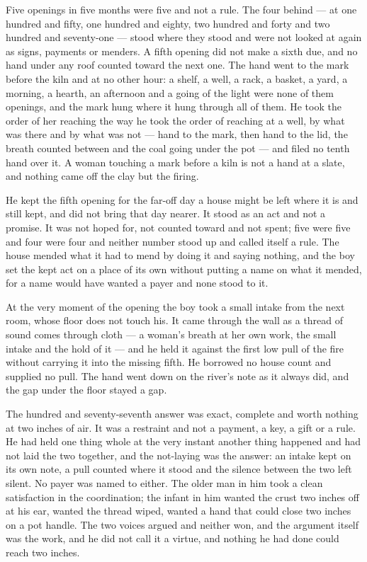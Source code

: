Five openings in five months were five and not a rule. The four behind --- at one hundred and fifty, one hundred and eighty, two hundred and forty and two hundred and seventy-one --- stood where they stood and were not looked at again as signs, payments or menders. A fifth opening did not make a sixth due, and no hand under any roof counted toward the next one. The hand went to the mark before the kiln and at no other hour: a shelf, a well, a rack, a basket, a yard, a morning, a hearth, an afternoon and a going of the light were none of them openings, and the mark hung where it hung through all of them. He took the order of her reaching the way he took the order of reaching at a well, by what was there and by what was not --- hand to the mark, then hand to the lid, the breath counted between and the coal going under the pot --- and filed no tenth hand over it. A woman touching a mark before a kiln is not a hand at a slate, and nothing came off the clay but the firing.

He kept the fifth opening for the far-off day a house might be left where it is and still kept, and did not bring that day nearer. It stood as an act and not a promise. It was not hoped for, not counted toward and not spent; five were five and four were four and neither number stood up and called itself a rule. The house mended what it had to mend by doing it and saying nothing, and the boy set the kept act on a place of its own without putting a name on what it mended, for a name would have wanted a payer and none stood to it.

\scenebreak

At the very moment of the opening the boy took a small intake from the next room, whose floor does not touch his. It came through the wall as a thread of sound comes through cloth --- a woman's breath at her own work, the small intake and the hold of it --- and he held it against the first low pull of the fire without carrying it into the missing fifth. He borrowed no house count and supplied no pull. The hand went down on the river's note as it always did, and the gap under the floor stayed a gap.

The hundred and seventy-seventh answer was exact, complete and worth nothing at two inches of air. It was a restraint and not a payment, a key, a gift or a rule. He had held one thing whole at the very instant another thing happened and had not laid the two together, and the not-laying was the answer: an intake kept on its own note, a pull counted where it stood and the silence between the two left silent. No payer was named to either. The older man in him took a clean satisfaction in the coordination; the infant in him wanted the crust two inches off at his ear, wanted the thread wiped, wanted a hand that could close two inches on a pot handle. The two voices argued and neither won, and the argument itself was the work, and he did not call it a virtue, and nothing he had done could reach two inches.

